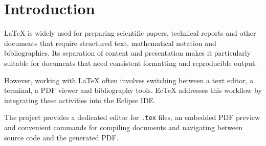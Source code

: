 \section{Introduction}

LaTeX is widely used for preparing scientific papers,
technical reports and other documents that require
structured text, mathematical notation and bibliographies.
Its separation of content and presentation makes it
particularly suitable for documents that need consistent
formatting and reproducible output.

However, working with LaTeX often involves switching
between a text editor, a terminal, a PDF viewer and
bibliography tools. EcTeX addresses this workflow by
integrating these activities into the Eclipse IDE.

The project provides a dedicated editor for \texttt{.tex}
files, an embedded PDF preview and convenient commands
for compiling documents and navigating between source
code and the generated PDF.
